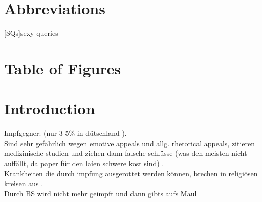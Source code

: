 \documentclass[12pt,a4paper,twoside]{article}
\begin{document}
\newpage
\tableofcontents
\newpage

\pagestyle{headings}

\newpage


\section*{Abbreviations}
\begin{acronym}[KPMG]%
	[SQs]{sexy queries}
\end{acronym}

\newpage

\section*{Table of Figures}

\newpage

\section{Introduction}
Impfgegner: (nur 3-5\% in dütschland \cite{Meyer2004}).\\
Sind sehr gefährlich wegen emotive appeals und allg. rhetorical appeals, zitieren medizinische studien und ziehen dann falsche schlüsse (was den meisten nicht auffällt, da paper für den laien schwere kost sind) \cite{Davies2002}.\\
Krankheiten die durch impfung ausgerottet werden können, brechen in religiösen kreisen aus \cite{Novotny1988}.\\
Durch BS wird nicht mehr geimpft und dann gibts aufs Maul \cite{Pincock2004}\\
%	
\end{document}
